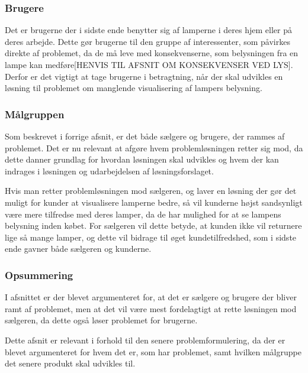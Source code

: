 \subsubsection{Brugere}
Det er brugerne der i sidste ende benytter sig af lamperne i deres hjem eller på deres arbejde. Dette gør brugerne til den gruppe af interessenter, som påvirkes direkte af problemet, da de må leve med konsekvenserne, som belysningen fra en lampe kan medføre[HENVIS TIL AFSNIT OM KONSEKVENSER VED LYS]. Derfor er det vigtigt at tage brugerne i betragtning, når der skal udvikles en løsning til problemet om manglende visualisering af lampers belysning. 

\subsubsection{Målgruppen}
Som beskrevet i forrige afsnit, er det både sælgere og brugere, der rammes af problemet. Det er nu relevant at afgøre hvem problemløsningen retter sig mod, da dette danner grundlag for hvordan løsningen skal udvikles og hvem der kan indrages i løsningen og udarbejdelsen af løsningsforslaget. 


Hvis man retter problemløsningen mod sælgeren, og laver en løsning der gør det muligt for kunder at visualisere lamperne bedre, så vil kunderne højst sandsynligt være mere tilfredse med deres lamper, da de har mulighed for at se lampens belysning inden købet. For sælgeren vil dette betyde, at kunden ikke vil returnere lige så mange lamper, og dette vil bidrage til øget kundetilfredshed, som i sidste ende gavner både sælgeren og kunderne.

\subsubsection*{Opsummering}
I afsnittet er der blevet argumenteret for, at det er sælgere og brugere der bliver ramt af problemet, men at det vil være mest fordelagtigt at rette løsningen mod sælgeren, da dette også løser problemet for brugerne.

Dette afsnit er relevant i forhold til den senere problemformulering, da der er blevet argumenteret for hvem det er, som har problemet, samt hvilken målgruppe det senere produkt skal udvikles til.
